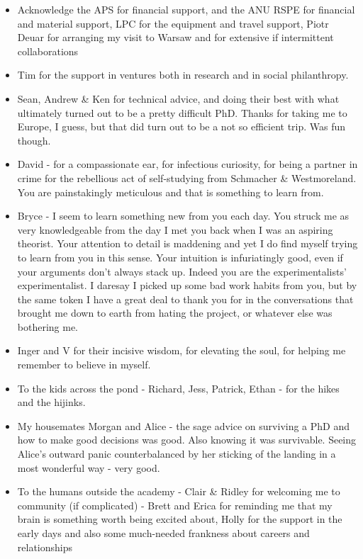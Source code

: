 \begin{itemize}
\tightlist
\item
  Acknowledge the APS for financial support, and the ANU RSPE for
  financial and material support, LPC for the equipment and travel
  support, Piotr Deuar for arranging my visit to Warsaw and for
  extensive if intermittent collaborations
\item
  Tim for the support in ventures both in research and in social
  philanthropy.
\item
  Sean, Andrew \& Ken for technical advice, and doing their best with
  what ultimately turned out to be a pretty difficult PhD. Thanks for
  taking me to Europe, I guess, but that did turn out to be a not so
  efficient trip. Was fun though.
\item
  David - for a compassionate ear, for infectious curiosity, for being a
  partner in crime for the rebellious act of self-studying from
  Schmacher \& Westmoreland. You are painstakingly meticulous and that
  is something to learn from.
\item
  Bryce - I seem to learn something new from you each day. You struck me
  as very knowledgeable from the day I met you back when I was an
  aspiring theorist. Your attention to detail is maddening and yet I do
  find myself trying to learn from you in this sense. Your intuition is
  infuriatingly good, even if your arguments don't always stack up.
  Indeed you are the experimentalists' experimentalist. I daresay I
  picked up some bad work habits from you, but by the same token I have
  a great deal to thank you for in the conversations that brought me
  down to earth from hating the project, or whatever else was bothering
  me.
\item
  Inger and V for their incisive wisdom, for elevating the soul, for
  helping me remember to believe in myself.
\item
  To the kids across the pond - Richard, Jess, Patrick, Ethan - for the
  hikes and the hijinks.
\item
  My housemates Morgan and Alice - the sage advice on surviving a PhD
  and how to make good decisions was good. Also knowing it was
  survivable. Seeing Alice's outward panic counterbalanced by her
  sticking of the landing in a most wonderful way - very good.
\item
  To the humans outside the academy - Clair \& Ridley for welcoming me
  to community (if complicated) - Brett and Erica for reminding me that
  my brain is something worth being excited about, Holly for the support
  in the early days and also some much-needed frankness about careers
  and relationships
\end{itemize}


